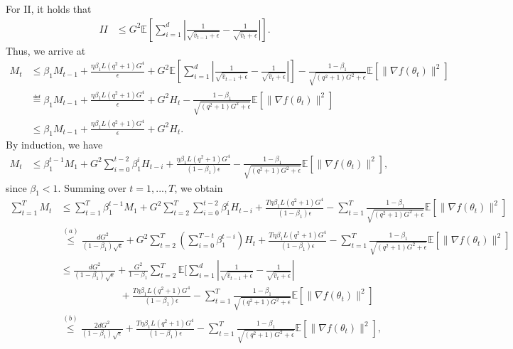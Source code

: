 \documentclass[11pt]{article}
\begin{document}
For II, it holds that
\begin{align*}
    II&\leq G^2 \mathbb E[\sum_{i=1}^d |\frac{1}{\sqrt{\hat v_{t-1}+\epsilon}}-\frac{1}{\sqrt{\hat v_t+\epsilon}}| ].
\end{align*}
Thus, we arrive at
\begin{align*}
    M_t&\leq \beta_1 M_{t-1}+\frac{\eta\beta_1 L(q^2+1)G^4}{\epsilon}+G^2 \mathbb E[\sum_{i=1}^d |\frac{1}{\sqrt{\hat v_{t-1}+\epsilon}}-\frac{1}{\sqrt{\hat v_t+\epsilon}}| ]-\frac{1-\beta_1}{\sqrt{(q^2+1)G^2+\epsilon}}\mathbb E[\|\nabla f(\theta_t)\|^2]\\
    &\eqdef \beta_1 M_{t-1}+\frac{\eta\beta_1 L(q^2+1)G^4}{\epsilon}+G^2 H_t-\frac{1-\beta_1}{\sqrt{(q^2+1)G^2+\epsilon}}\mathbb E[\|\nabla f(\theta_t)\|^2]\\
    &\leq \beta_1 M_{t-1}+\frac{\eta\beta_1 L(q^2+1)G^4}{\epsilon}+G^2 H_t.
\end{align*}
By induction, we have
\begin{align*}
    M_t&\leq \beta_1^{t-1} M_1+G^2 \sum_{i=0}^{t-2} \beta_1^i H_{t-i}+ \frac{\eta\beta_1 L(q^2+1)G^4}{(1-\beta_1)\epsilon}-\frac{1-\beta_1}{\sqrt{(q^2+1)G^2+\epsilon}}\mathbb E[\|\nabla f(\theta_t)\|^2],
\end{align*}
since $\beta_1<1$. Summing over $t=1,...,T$, we obtain
\begin{align*}
    \sum_{t=1}^T M_t&\leq \sum_{t=1}^T \beta_1^{t-1} M_1+G^2\sum_{t=2}^T \sum_{i=0}^{t-2} \beta_1^i H_{t-i}+ \frac{T \eta\beta_1 L(q^2+1)G^4}{(1-\beta_1)\epsilon}-\sum_{t=1}^T \frac{1-\beta_1}{\sqrt{(q^2+1)G^2+\epsilon}}\mathbb E[\|\nabla f(\theta_t)\|^2]\\
    &\overset{(a)}{\leq} \frac{dG^2}{(1-\beta_1)\sqrt\epsilon}+G^2\sum_{t=2}^T (\sum_{i=0}^{T-t} \beta_1^{t-i})H_t+ \frac{T \eta\beta_1 L(q^2+1)G^4}{(1-\beta_1)\epsilon}-\sum_{t=1}^T \frac{1-\beta_1}{\sqrt{(q^2+1)G^2+\epsilon}}\mathbb E[\|\nabla f(\theta_t)\|^2]\\
    &\leq \frac{dG^2}{(1-\beta_1)\sqrt\epsilon}+\frac{G^2}{1-\beta_1}\sum_{t=2}^T \mathbb E[\sum_{i=1}^d |\frac{1}{\sqrt{\hat v_{t-1}+\epsilon}}-\frac{1}{\sqrt{\hat v_t+\epsilon}}|\\
    &\hspace{1in} + \frac{T \eta\beta_1 L(q^2+1)G^4}{(1-\beta_1)\epsilon}-\sum_{t=1}^T \frac{1-\beta_1}{\sqrt{(q^2+1)G^2+\epsilon}}\mathbb E[\|\nabla f(\theta_t)\|^2]\\
    &\overset{(b)}{\leq} \frac{2dG^2}{(1-\beta_1)\sqrt\epsilon}+ \frac{T \eta\beta_1 L(q^2+1)G^4}{(1-\beta_1)\epsilon}-\sum_{t=1}^T \frac{1-\beta_1}{\sqrt{(q^2+1)G^2+\epsilon}}\mathbb E[\|\nabla f(\theta_t)\|^2],
\end{align*}
\end{document}
